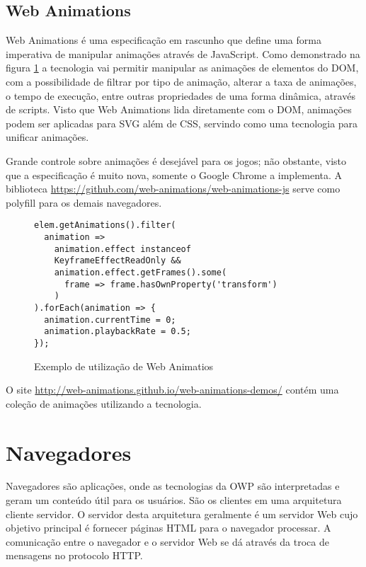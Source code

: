 \subsection{Web Animations}

Web Animations é uma especificação em rascunho que define uma forma
imperativa de manipular animações através de JavaScript. Como
demonstrado na figura \ref{fig:webAnimations} a tecnologia vai permitir
manipular as animações de elementos do DOM, com a possibilidade
de filtrar por tipo de animação, alterar a taxa de animações, o
tempo de execução, entre outras propriedades de uma forma dinâmica,
através de scripts. Visto que Web Animations lida diretamente com o
DOM, animações podem ser aplicadas para SVG além de CSS, servindo
como uma tecnologia para unificar animações.

Grande controle sobre animações é desejável para os
jogos; não obstante, visto que a especificação é muito
nova, somente o Google Chrome a implementa. A biblioteca
\url{https://github.com/web-animations/web-animations-js} serve como
polyfill para os demais navegadores.

\begin{figure}[H]
    \centering
    \begin{verbatim}
elem.getAnimations().filter(
  animation =>
    animation.effect instanceof 
    KeyframeEffectReadOnly &&
    animation.effect.getFrames().some(
      frame => frame.hasOwnProperty('transform')
    )
).forEach(animation => {
  animation.currentTime = 0;
  animation.playbackRate = 0.5;
});
    \end{verbatim}
	\caption{Exemplo de utilização de Web Animatios}
    \label{fig:webAnimations}
\end{figure}

O site \url{http://web-animations.github.io/web-animations-demos/} contém uma
coleção de animações utilizando a tecnologia.

\section{Navegadores}
Navegadores são aplicações, onde as tecnologias da OWP são
interpretadas e geram um conteúdo útil para os usuários. São
os clientes em uma arquitetura cliente servidor. O servidor desta
arquitetura geralmente é um servidor Web cujo objetivo principal é
fornecer páginas HTML para o navegador processar. A comunicação entre
o navegador e o servidor Web se dá através da troca de mensagens no
protocolo HTTP.


